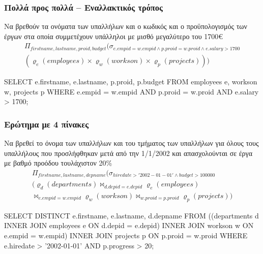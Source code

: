 \begin{frame}
\frametitle{Πολλά προς πολλά -- Εναλλακτικός τρόπος}
\begin{minipage}{\wE}
\begin{exampleblock}{\small Να βρεθούν τα ονόματα των υπαλλήλων και ο κωδικός και ο προϋπολογισμός των
              έργων στα οποία συμμετέχουν  υπάλληλοι με μισθό μεγαλύτερο του 1700\euro}
\en
\[
\begin{array}{l}
  \Pi_{firstname, lastname, proid, budget}
  (\sigma_{e.empid = w.empid \wedge p.proid = w.proid \wedge e.salary>1700 }     \\
    ( \varrho_{e} (employees) \times \varrho_{w} (workson)
      \times \varrho_{p} (projects)   )
  )
\end{array}
\]
\begin{SQL}
  SELECT e.firstname, e.lastname, p.proid, p.budget
    FROM employees e, workson w, projects p
   WHERE e.empid = w.empid
     AND p.proid = w.proid
     AND e.salary > 1700;
\end{SQL}
\el
\end{exampleblock}
\end{minipage}
\end{frame}


\begin{frame}
\frametitle{Ερώτημα με 4 πίνακες}
\begin{minipage}{\wE}
\vspace{-0.5cm}
\begin{exampleblock}{\footnotesize Να βρεθεί το όνομα των υπαλλήλων και του τμήματος των υπαλλήλων
             για όλους τους υπαλλήλους που προσλήφθηκαν μετά από την 1/1/2002 και
             απασχολούνται σε έργα με βαθμό προόδου τουλάχιστον 20\%}
\vspace{-0.5cm}             
\en
\[
\begin{array}{l}
 \Pi_{firstname, lastname, depname}
 (\sigma_{hiredate>'2002-01-01' \wedge budget>100000} \\
 ( \varrho_{d} (departments) \bowtie_{d.depid=e.depid}
    \varrho_{e} (employees)  \\ \bowtie_{e.empid=w.empid} \varrho_{w} (workson)
     \bowtie_{w.proid=p.proid} \varrho_{p} (projects)   )
\end{array}
\]
\pause
\vspace{-0.5cm}
\en
\begin{SQL}
  SELECT DISTINCT e.firstname, e.lastname, d.depname
    FROM ((departments d INNER JOIN employees e
         ON d.depid = e.depid)
                         INNER JOIN workson w
         ON e.empid = w.empid)
                         INNER JOIN projects p
         ON p.proid = w.proid
   WHERE e.hiredate > '2002-01-01'
     AND p.progress > 20;
\end{SQL}
\el
\end{exampleblock}
\end{minipage}
\end{frame}

